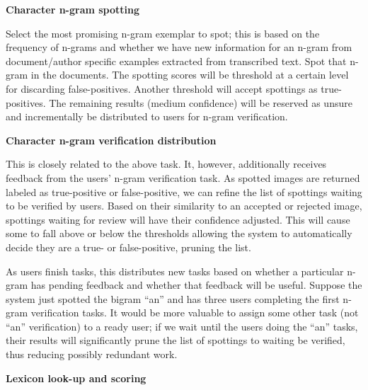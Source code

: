 \documentclass[ms]{byuprop}
\begin{document}
{\setlength{\parindent}{0cm}
\textbf{Character n-gram spotting}

\begin{addmargin}[3em]{3em}
Select the most promising n-gram exemplar to spot; this is based on the frequency of n-grams and whether we have new information for an n-gram from document/author specific examples extracted from transcribed text. Spot that n-gram in the documents. The spotting scores will be threshold at a certain level for discarding false-positives. Another threshold will accept spottings as true-positives. The remaining results (medium confidence) will be reserved as unsure and incrementally be distributed to users for n-gram verification.
\\[.5cm]
\end{addmargin}

\textbf{Character n-gram verification distribution}

\begin{addmargin}[3em]{3em}
This is closely related to the above task. It, however, additionally receives feedback from the users' n-gram verification task. As spotted images are returned labeled as true-positive or false-positive, we can refine the list of spottings waiting to be verified by users. Based on their similarity to an accepted or rejected image, spottings waiting for review will have their confidence adjusted. This will cause some to fall above or below the thresholds allowing the system to automatically decide they are a true- or false-positive, pruning the list.

As users finish tasks, this distributes new tasks based on whether a particular n-gram has pending feedback and whether that feedback will be useful. Suppose the system just spotted the bigram ``an'' and has three users completing the first n-gram verification tasks. It would be more valuable to assign some other task (not ``an'' verification) to a ready user; if we wait until the users doing the ``an'' tasks, their results will significantly prune the list of spottings to waiting be verified, thus reducing possibly redundant work.
\\[.5cm]
\end{addmargin}

\textbf{Lexicon look-up and scoring}

}
\end{document}

